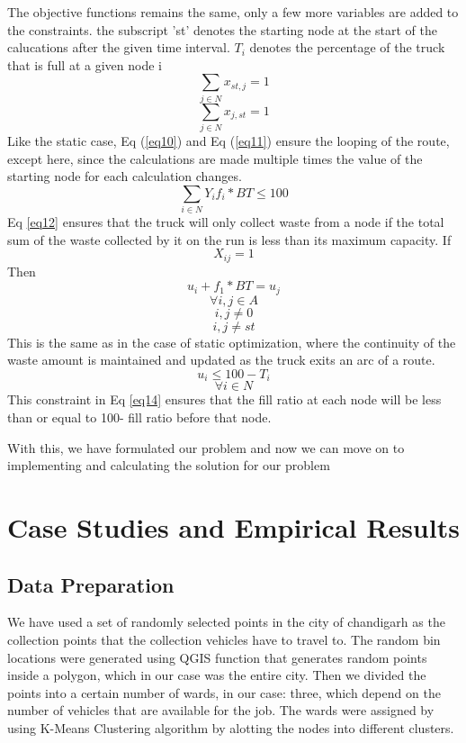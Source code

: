 \documentclass[12pt]{article}
\begin{document}
The objective functions remains the same, only a few more variables are added to the constraints. the subscript 'st' denotes the starting node at the start of the calucations after the given time interval. $T_i$ denotes the percentage of the truck that is full at a given node i
\begin{equation}\label{eq10}
    \sum_{j\in N}x_{st,j}=1
\end{equation}
\begin{equation}\label{eq11}
    \sum_{j\in N}x_{j,st}=1
\end{equation}
Like the static case, Eq (\ref{eq10}) and Eq (\ref{eq11}) ensure the looping of the route, except here, since the calculations are made multiple times the value of the starting node for each calculation changes.
\begin{equation}\label{eq12}
    \sum_{i\in N}Y_i f_i* BT\le100
\end{equation}
Eq \eqref{eq12} ensures that the truck will only collect waste from a node if the total sum of the waste collected by it on the run is less than its maximum capacity.
If
$$X_{ij}=1$$
Then
\begin{equation}\label{eq13}
    u_i+f_1*BT=u_j
\end{equation}
$$\forall i,j\in A$$
$$i,j\ne 0 $$
$$ i,j \ne st $$
This is the same as in the case of static optimization, where the continuity of the waste amount is maintained and updated as the truck exits an arc of a route.
\begin{equation}\label{eq14}
    u_i\le 100 - T_i
\end{equation}
$$\forall i \in N $$
This constraint in Eq \eqref{eq14} ensures that the fill ratio at each node will be less than or equal to 100- fill ratio before that node.

With this, we have formulated our problem and now we can move on to implementing and calculating the solution for our problem

\section{Case Studies and Empirical Results}

\subsection{Data Preparation}

We have used a set of randomly selected points in the city of chandigarh as the collection points that the collection vehicles have to travel to. The random bin locations were generated using QGIS function that generates random points inside a polygon, which in our case was the entire city. Then we divided the points into a certain number of wards, in our case: three, which depend on the number of vehicles that are available for the job. The wards were assigned by using K-Means Clustering algorithm by alotting the nodes into different clusters.
\end{document}
